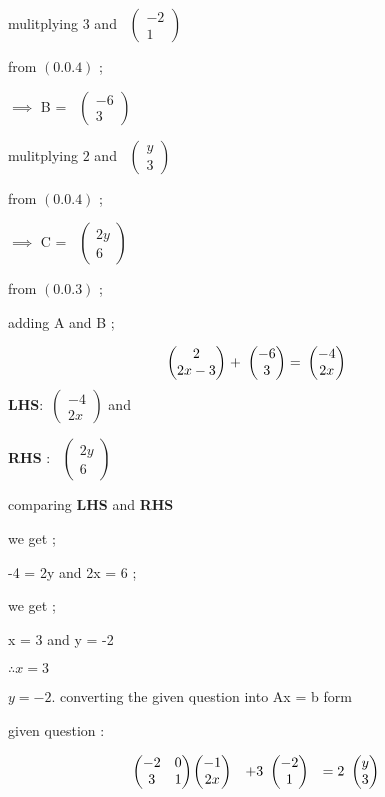 \documentclass[journal,12pt,twocolumn]{IEEEtran}
\theoremstyle{remark}
\newcommand{\myvec}[1]{\ensuremath{\begin{pmatrix}#1\end{pmatrix}}}
\numberwithin{equation}{subsection}
\begin{document}
    mulitplying 
    $3$ and
       \ \myvec{-2 \\1 } 
      
     from $(0.0.4)$ ;
      
       $\implies$  B = \ \myvec{-6 \\3 } 
       
       mulitplying 
    $2$ and  
\ \myvec{y \\ 3 } 

      
     from $(0.0.4)$ ;
      
       $\implies$  C = 
\ \myvec{2y \\6 } 
      
      from $(0.0.3)$ ; 
      
      adding A and B ;
       
     \begin{align}
&\ \myvec{2\\2x-3 }& \hspace{-0.25cm} +
&\ \myvec{-6\\3} & \hspace{-0.25cm}= 
&\ \myvec{-4\\2x} &
\end{align} 
      \newpage
\textbf{LHS}:\ \myvec{-4 \\2x } 
      and \hspace{3cm}
     
  \textbf {RHS} : 
\ \myvec{2y \\6 } 
      
      
      comparing \textbf{LHS} and \textbf{RHS}
      
      we get ;
      
      -4 = 2y and 2x = 6 ;
      
      we get ;
      
      x = 3 and y = -2 
      
  $ \therefore x = 3 $
     
                 $   y = -2 $.
     \newpage
     \large
   converting the given question into Ax = b form 
   
   given question :
   
    \begin{align}
&\ \myvec{-2 & 0\\3 & 1}& \hspace{-0.5cm}
&\ \myvec{-1\\2x}&  
 + 3&\ \myvec{-2 \\1 }& 
 = 2&\ \myvec{y \\3 }& 
      \end{align} 
      
\end{document}
